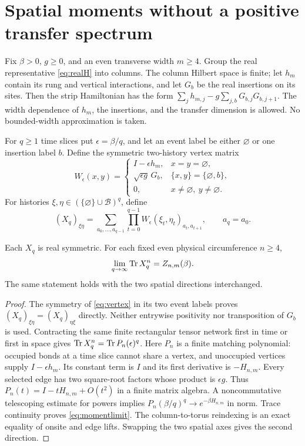\section{Spatial moments without a positive transfer spectrum}\label{sec:transfer}
Fix $\beta>0$, $g\ge0$, and an even transverse width $m\ge4$. Group the real representative \eqref{eq:realH}
into columns. The column Hilbert space is finite; let $h_m$ contain its rung
and vertical interactions, and let $G_b$ be the real insertions on its sites.
Then the strip Hamiltonian has the form
$\sum_j h_{m,j}-g\sum_{j,b}G_{b,j}G_{b,j+1}$.
The width dependence of $h_m$, the insertions, and the transfer dimension is
allowed. No bounded-width approximation is taken.

For $q\ge1$ time slices put $\epsilon=\beta/q$, and let an event label be either
$\varnothing$ or one insertion label $b$. Define the symmetric two-history
vertex matrix
\begin{equation}\label{eq:vertex}
 W_{\epsilon}(x,y)=
 \begin{cases}
 I-\epsilon h_m,&x=y=\varnothing,\\
 \sqrt{\epsilon g}\,G_b,&\{x,y\}=\{\varnothing,b\},\\
 0,&x\ne\varnothing,\ y\ne\varnothing.
 \end{cases}
\end{equation}
For histories $\xi,\eta\in(\{\varnothing\}\cup\mathcal B)^q$, define
\begin{equation}\label{eq:transfer}
 (X_q)_{\xi\eta}=
 \sum_{a_0,\ldots,a_{q-1}}\prod_{t=0}^{q-1}
   W_{\epsilon}(\xi_t,\eta_t)_{a_t,a_{t+1}},\qquad a_q=a_0.
\end{equation}

\begin{proposition}\label{prop:transfer}
Each $X_q$ is real symmetric. For each fixed even physical circumference $n\ge4$,
\begin{equation}\label{eq:momentlimit}
 \lim_{q\to\infty}\operatorname{Tr} X_q^n=Z_{n,m}(\beta).
\end{equation}
The same statement holds with the two spatial directions interchanged.
\end{proposition}
\begin{proof}
The symmetry of \eqref{eq:vertex} in its two event labels proves
$(X_q)_{\xi\eta}=(X_q)_{\eta\xi}$ directly. Neither entrywise positivity nor
transposition of $G_b$ is used. Contracting the same finite rectangular tensor
network first in time or first in space gives
$\operatorname{Tr} X_q^n=\operatorname{Tr} P_n(\epsilon)^q$. Here $P_n$ is a finite matching polynomial:
occupied bonds at a time slice cannot share a vertex, and unoccupied vertices
supply $I-\epsilon h_m$. Its constant term is $I$ and its first derivative is
$-H_{n,m}$. Every selected edge has two square-root factors whose product is
$\epsilon g$. Thus $P_n(t)=I-tH_{n,m}+O(t^2)$ in a finite matrix algebra.
A noncommutative telescoping estimate for powers implies
$P_n(\beta/q)^q\to e^{-\beta H_{n,m}}$ in norm. Trace continuity proves
\eqref{eq:momentlimit}. The column-to-torus reindexing is an exact equality of
onsite and edge lifts. Swapping the two spatial axes gives the second direction.
\end{proof}

